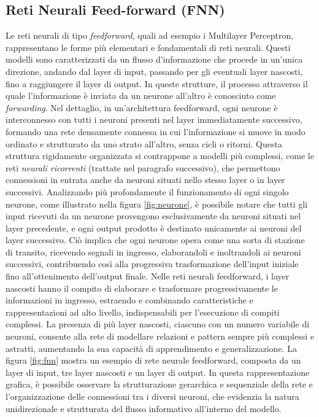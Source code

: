 \documentclass[12pt,a4paper,twoside,openright]{book}
\begin{document}
\subsection{Reti Neurali Feed-forward (FNN)}
Le reti neurali di tipo \emph{feedforward}, quali ad esempio i Multilayer Perceptron, rappresentano le forme più elementari e fondamentali di reti neurali. Questi modelli sono caratterizzati da un flusso d’informazione che procede in un’unica direzione, andando dal layer di input, passando per gli eventuali layer nascosti, fino a raggiungere il layer di output. In queste strutture, il processo attraverso il quale l’informazione è inviata da un neurone all’altro è conosciuto come \emph{forwarding}.
Nel dettaglio, in un'architettura feedforward, ogni neurone è interconnesso con tutti i neuroni presenti nel layer immediatamente successivo, formando una rete densamente connessa in cui l'informazione si muove in modo ordinato e strutturato da uno strato all'altro, senza cicli o ritorni. Questa struttura rigidamente organizzata si contrappone a modelli più complessi, come le reti \emph{neurali ricorrenti} (trattate nel paragrafo successivo), che permettono connessioni in entrata anche da neuroni situati nello stesso layer o in layer successivi.
Analizzando più profondamente il funzionamento di ogni singolo neurone, come illustrato nella figura \ref{fig:neurone}, è possibile notare che tutti gli input ricevuti da un neurone provengono esclusivamente da neuroni situati nel layer precedente, e ogni output prodotto è destinato unicamente ai neuroni del layer successivo. Ciò implica che ogni neurone opera come una sorta di stazione di transito, ricevendo segnali in ingresso, elaborandoli e inoltrandoli ai neuroni successivi, contribuendo così alla progressiva trasformazione dell'input iniziale fino all'ottenimento dell'output finale.
Nelle reti neurali feedforward, i layer nascosti hanno il compito di elaborare e trasformare progressivamente le informazioni in ingresso, estraendo e combinando caratteristiche e rappresentazioni ad alto livello, indispensabili per l'esecuzione di compiti complessi. La presenza di più layer nascosti, ciascuno con un numero variabile di neuroni, consente alla rete di modellare relazioni e pattern sempre più complessi e astratti, aumentando la sua capacità di apprendimento e generalizzazione.
La figura \ref{fig:fnn} mostra un esempio di rete neurale feedforward, composta da un layer di input, tre layer nascosti e un layer di output. In questa rappresentazione grafica, è possibile osservare la strutturazione gerarchica e sequenziale della rete e l'organizzazione delle connessioni tra i diversi neuroni, che evidenzia la natura unidirezionale e strutturata del flusso informativo all'interno del modello.
\end{document}
